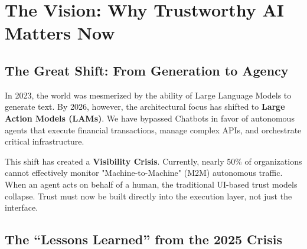 
\chapter{The Vision: Why Trustworthy AI Matters Now}
\label{chap:vision}


\section{The Great Shift: From Generation to Agency}
\label{sec:generation_to_agency}

In 2023, the world was mesmerized by the ability of Large Language Models to generate text. By 2026, however, the architectural focus has shifted to \textbf{Large Action Models (LAMs)}. We have bypassed Chatbots in favor of autonomous agents that execute financial transactions, manage complex APIs, and orchestrate critical infrastructure.

This shift has created a \textbf{Visibility Crisis}. Currently, nearly 50\% of organizations cannot effectively monitor "Machine-to-Machine" (M2M) autonomous traffic. When an agent acts on behalf of a human, the traditional UI-based trust models collapse. Trust must now be built directly into the execution layer, not just the interface.

\section{The ``Lessons Learned'' from the 2025 Crisis}
\label{sec:crisis_2025}


